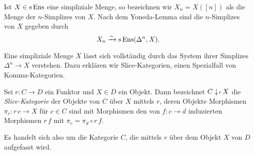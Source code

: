 Ist $X \in \operatorname{s}\operatorname{Ens}$ eine simpliziale Menge, so bezeichnen wir $X_n =
X([n])$ als die Menge der $n$-Simplizes von $X$. Nach dem Yoneda-Lemma
sind die $n$-Simplizes von $X$ gegeben durch
\begin{equation} \label{eq:simp-as-hom}
  X_n \xrightarrow[]{\sim} \operatorname{s}\operatorname{Ens}(\Delta^n, X).
\end{equation}

Eine simpliziale Menge $X$ lässt sich vollständig durch das System
ihrer Simplizes $\Delta^n \to X$ verstehen. Dazu erklären wir
Slice-Kategorien, einen Spezialfall von Komma-Kategorien.
\begin{defn}
  Sei $r: C \to D$ ein Funktor und $X \in D$ ein Objekt. Dann
  bezeichnet $C \downarrow \! {\scriptstyle r} \, X$ die \emph{Slice-Kategorie} der
  Objekte von $C$ über $X$ mittels $r$, deren Objekte Morphismen
  $\pi_c: r\,c \to X$ für $c \in C$ sind mit Morphismen den von $f: c
  \to d$ induzierten Morphismen $r\,f$ mit $\pi_c = \pi_d \circ r\,f$.
\end{defn}
Es handelt sich also um die Kategorie $C$, die mittels $r$ über dem
Objekt $X$ von $D$ aufgefasst wird.

